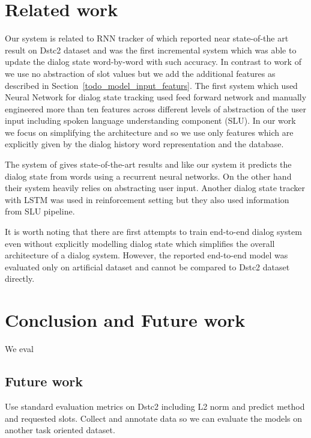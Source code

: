 \documentclass{itatnew}
\begin{document}
\section{Related work}
\label{sec:related}
Our system is related to RNN tracker of \cite{zilka2015incremental} which reported near state-of-the art result on Dstc2 dataset and was the first incremental system which was able to update the dialog state word-by-word with such accuracy.
In contrast to work of \cite{zilka2015incremental} we use no abstraction of slot values but we add the additional features as described in Section~\ref{todo_model_input_featurs}.
The first system which used Neural Network for dialog state tracking \cite{henderson2013deep} used feed forward network and manually engineered more than ten features across different levels of abstraction of the user input including spoken language understanding component (SLU).
In our work we focus on simplifying the architecture and so we use only features which are explicitly given by the dialog history word representation and the database.

The system of \cite{henderson2014word} gives state-of-the-art results and like our system it predicts the dialog state from words using a recurrent neural networks.
On the other hand their system heavily relies on abstracting user input.
Another dialog state tracker with LSTM was used in reinforcement setting but they also used information from SLU pipeline.\cite{lee2016dialog}

It is worth noting that there are first attempts to train end-to-end dialog system even without explicitly modelling dialog state\cite{bordes2016learning} which simplifies the overall architecture of a dialog system.
However, the reported end-to-end model was evaluated only on artificial dataset and cannot be compared to Dstc2 dataset directly.

\section{Conclusion and Future work}
\label{sec:conc}
We eval


\subsection*{Future work}
Use standard evaluation metrics on Dstc2 including L2 norm and predict method and requested slots.
Collect and annotate data so we can evaluate the models on another task oriented dataset.
\end{document}
